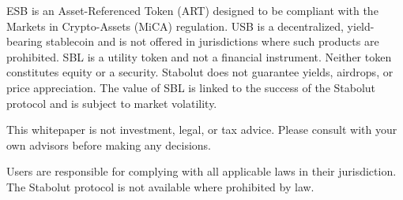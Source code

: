 ESB is an Asset-Referenced Token (ART) designed to be compliant with the Markets in Crypto-Assets (MiCA) regulation. USB is a decentralized, yield-bearing stablecoin and is not offered in jurisdictions where such products are prohibited. SBL is a utility token and not a financial instrument. Neither token constitutes equity or a security. Stabolut does not guarantee yields, airdrops, or price appreciation. The value of SBL is linked to the success of the Stabolut protocol and is subject to market volatility.

This whitepaper is not investment, legal, or tax advice. Please consult with your own advisors before making any decisions.

Users are responsible for complying with all applicable laws in their jurisdiction. The Stabolut protocol is not available where prohibited by law.
  